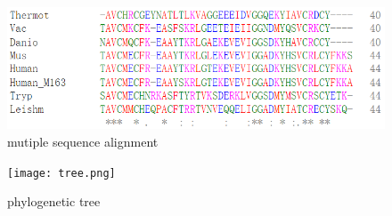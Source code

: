 \documentclass{article}
\begin{document}
\begin{flushleft}
\begin{itemize}
\end{itemize}
\begin{figure}[H]
    \centering
    \includegraphics[scale=0.8]{alignment.png}
    \caption{mutiple sequence alignment}
\end{figure}
\begin{figure}[H]
    \centering
    \texttt{[image: tree.png]}
    \caption{phylogenetic tree}
\end{figure}
\end{flushleft}
\end{document}
